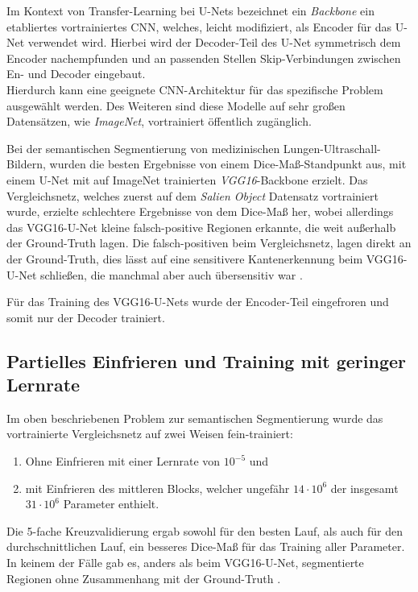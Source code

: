 Im Kontext von Transfer-Learning bei U-Nets bezeichnet ein \textit{Backbone} ein etabliertes vortrainiertes \ac{CNN}, 
welches, leicht modifiziert, als Encoder für das U-Net verwendet wird. Hierbei wird der Decoder-Teil des U-Net 
symmetrisch dem Encoder nachempfunden und an passenden Stellen Skip-Verbindungen zwischen En- und Decoder eingebaut. \\
Hierdurch kann eine geeignete \ac{CNN}-Architektur für das spezifische Problem ausgewählt werden. Des Weiteren sind diese 
Modelle auf sehr großen Datensätzen, wie \textit{ImageNet}, vortrainiert öffentlich zugänglich. 

Bei der semantischen Segmentierung von medizinischen Lungen-Ultraschall-Bildern, wurden die besten Ergebnisse von einem Dice-Maß-Standpunkt aus, 
mit einem U-Net mit auf ImageNet trainierten \textit{VGG16}-Backbone erzielt. Das Vergleichsnetz, welches zuerst auf dem \textit{Salien Object}
Datensatz vortrainiert wurde, erzielte schlechtere Ergebnisse von dem Dice-Maß her, wobei allerdings das VGG16-U-Net kleine falsch-positive 
Regionen erkannte, die weit außerhalb der Ground-Truth lagen. Die falsch-positiven beim Vergleichsnetz, lagen direkt an der Ground-Truth, 
dies lässt auf eine sensitivere Kantenerkennung beim VGG16-U-Net schließen, die manchmal aber auch übersensitiv war \cite{Cheng.05.10.2021}. 

Für das Training des VGG16-U-Nets wurde der Encoder-Teil eingefroren und somit nur der Decoder trainiert. 

\subsection{Partielles Einfrieren und Training mit geringer Lernrate}

Im oben beschriebenen Problem zur semantischen Segmentierung wurde das vortrainierte Vergleichsnetz auf zwei Weisen fein-trainiert:
\begin{enumerate}
	\item Ohne Einfrieren mit einer Lernrate von $10^{-5}$ und
	\item mit Einfrieren des mittleren Blocks, welcher ungefähr $14\cdot 10^6$ der insgesamt $31 \cdot 10^6$ Parameter enthielt. 
\end{enumerate}
Die 5-fache Kreuzvalidierung ergab sowohl für den besten Lauf, als auch für den durchschnittlichen Lauf, ein besseres Dice-Maß 
für das Training aller Parameter. In keinem der Fälle gab es, anders als beim VGG16-U-Net, segmentierte Regionen ohne Zusammenhang mit der Ground-Truth \cite{Cheng.05.10.2021}. 

